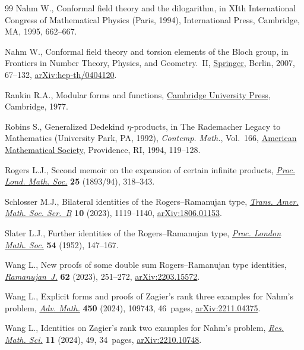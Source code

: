 \documentclass[10pt,a4paper]{amsart}
\numberwithin{equation}{section}
\theoremstyle{definition}
\begin{document}
\begin{thebibliography}{99}
Nahm W., Conformal field theory and the dilogarithm, in X{I}th {I}nternational
 {C}ongress of {M}athematical {P}hysics ({P}aris, 1994), International Press,
 Cambridge, MA, 1995, 662--667.

Nahm W., Conformal field theory and torsion elements of the {B}loch group, in
 Frontiers in Number Theory, Physics, and Geometry.~{II},
 \href{https://doi.org/10.1007/978-3-540-30308-4_2}{Springer}, Berlin, 2007,
 67--132, \href{http://arxiv.org/abs/hep-th/0404120}{arXiv:hep-th/0404120}.

Rankin R.A., Modular forms and functions,
 \href{https://doi.org/10.1017/CBO9780511566035}{Cambridge University Press},
 Cambridge, 1977.

Robins S., Generalized {D}edekind {$\eta$}-products, in The {R}ademacher Legacy
 to Mathematics ({U}niversity {P}ark, {PA}, 1992), \textit{Contemp. Math.},
 Vol.~166, \href{https://doi.org/10.1090/conm/166/01645}{American Mathematical
 Society}, Providence, RI, 1994, 119--128.

Rogers L.J., Second memoir on the expansion of certain infinite products, \href{https://doi.org/10.1112/plms/s1-25.1.318}{\textit{Proc.
 Lond. Math. Soc.}} \textbf{25} (1893/94), 318--343.

Schlosser M.J., Bilateral identities of the {R}ogers--{R}amanujan type,
 \href{https://doi.org/10.1090/btran/158}{\textit{Trans. Amer. Math. Soc.
 Ser.~B}} \textbf{10} (2023), 1119--1140,
 \href{http://arxiv.org/abs/1806.01153}{arXiv:1806.01153}.

Slater L.J., Further identities of the {R}ogers--{R}amanujan type,
 \href{https://doi.org/10.1112/plms/s2-54.2.147}{\textit{Proc. London Math.
 Soc.}} \textbf{54} (1952), 147--167.

Wang L., New proofs of some double sum {R}ogers--{R}amanujan type identities,
 \href{https://doi.org/10.1007/s11139-022-00654-5}{\textit{Ramanujan~J.}}
 \textbf{62} (2023), 251--272,
 \href{http://arxiv.org/abs/2203.15572}{arXiv:2203.15572}.

Wang L., Explicit forms and proofs of {Z}agier's rank three examples for
 {N}ahm's problem,
 \href{https://doi.org/10.1016/j.aim.2024.109743}{\textit{Adv. Math.}}
 \textbf{450} (2024), 109743, 46~pages,
 \href{http://arxiv.org/abs/2211.04375}{arXiv:2211.04375}.

Wang L., Identities on {Z}agier's rank two examples for {N}ahm's problem,
 \href{https://doi.org/10.1007/s40687-024-00460-z}{\textit{Res. Math. Sci.}}
 \textbf{11} (2024), 49, 34~pages,
 \href{http://arxiv.org/abs/2210.10748}{arXiv:2210.10748}.


\end{thebibliography}
\end{document}
